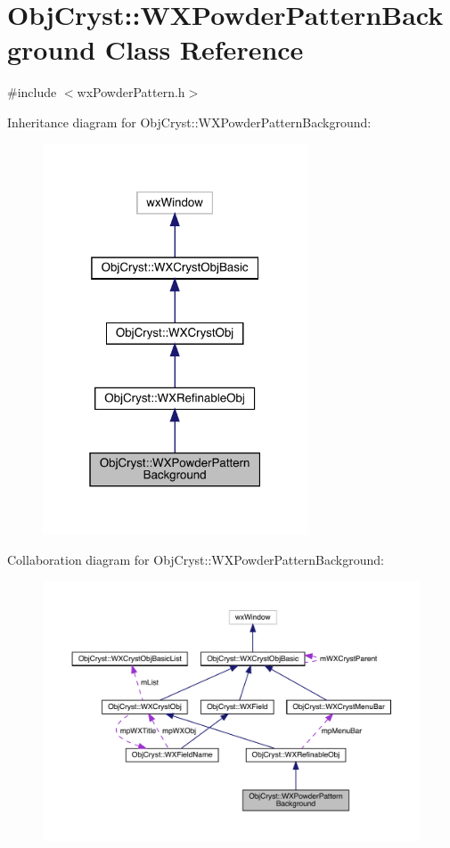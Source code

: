 \hypertarget{class_obj_cryst_1_1_w_x_powder_pattern_background}{}\section{Obj\+Cryst\+::W\+X\+Powder\+Pattern\+Background Class Reference}
\label{class_obj_cryst_1_1_w_x_powder_pattern_background}


{\ttfamily \#include $<$wx\+Powder\+Pattern.\+h$>$}



Inheritance diagram for Obj\+Cryst\+::W\+X\+Powder\+Pattern\+Background\+:
\nopagebreak
\begin{figure}[H]
\begin{center}
\leavevmode
\includegraphics[width=223pt]{class_obj_cryst_1_1_w_x_powder_pattern_background__inherit__graph}
\end{center}
\end{figure}


Collaboration diagram for Obj\+Cryst\+::W\+X\+Powder\+Pattern\+Background\+:
\nopagebreak
\begin{figure}[H]
\begin{center}
\leavevmode
\includegraphics[width=350pt]{class_obj_cryst_1_1_w_x_powder_pattern_background__coll__graph}
\end{center}
\end{figure}
